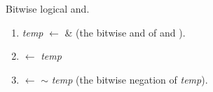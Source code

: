 


Bitwise logical {\sc and}.

\begin{enumerate}

\item {\em temp} $\leftarrow$  \& 
		(the bitwise {\sc and} of  and ).

\item {} $\leftarrow$ {\em temp}

\item {}   $\leftarrow$ $\sim$ {\em temp}
		(the bitwise negation of {\em temp}).

\end{enumerate}


